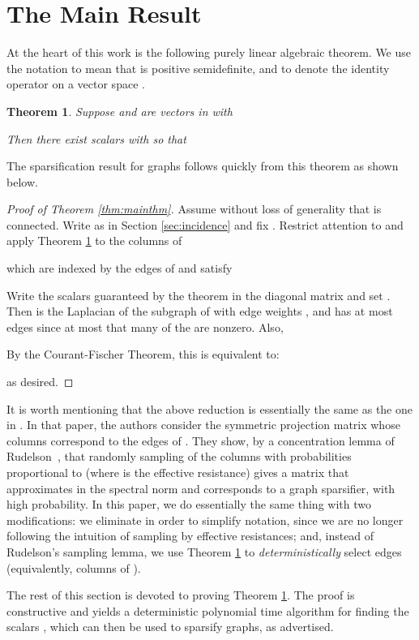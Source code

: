 \documentclass[12pt]{article}
\newtheorem{theorem}{Theorem}[section]
\begin{document}
\section{The Main Result}
At the heart of this work is the following purely linear algebraic theorem.
We use the notation  to mean that  is positive
  semidefinite, and  to denote the identity operator on a vector space .
\begin{theorem}\label{thm:linalg}
Suppose  and  are vectors in  with

Then there exist scalars  with  so that

\end{theorem}
\noindent The sparsification result for graphs follows quickly from this theorem as shown below.
\begin{proof}[Proof of Theorem \ref{thm:mainthm}]
Assume without loss of generality that  is connected. Write  as in Section \ref{sec:incidence} and fix . 
Restrict attention to  and apply Theorem \ref{thm:linalg} to the columns  of 
 
which are indexed by the edges of  and satisfy

Write the scalars  guaranteed by the theorem in the  diagonal
matrix  and set . Then  is the Laplacian of
the subgraph  of  with edge weights , and  has at most 
edges since at most that many of the  are nonzero. Also,


By the Courant-Fischer Theorem, this is equivalent to:

as desired.
\end{proof}

It is worth mentioning that the above reduction is essentially the same as
  the one in \cite{SpielmanSrivastava}. 
In that paper, the authors consider the
  symmetric projection matrix  whose columns 
  correspond to the edges of .
They show, by a concentration lemma of Rudelson~\cite{rudl},
  that randomly sampling  of the columns with probabilities proportional to
   (where  is the effective
  resistance)
  gives a matrix  that approximates  in the
  spectral norm and corresponds to a graph sparsifier, with high probability.
In this paper, we do essentially the same thing with two modifications:
  we eliminate  in order to simplify notation, since we are no longer
  following the intuition of sampling by effective resistances; and, instead of
  Rudelson's 
  sampling lemma, we use Theorem \ref{thm:linalg} to {\em deterministically}
  select  edges (equivalently, columns of ).

The rest of this section is devoted to proving Theorem \ref{thm:linalg}.
The proof is constructive and yields a deterministic polynomial time algorithm for finding the
  scalars , which can then be used to sparsify graphs, as advertised.
\end{document}
